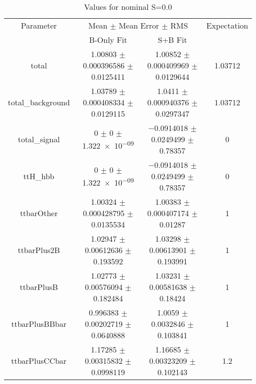 \begin{table}
\centering
\caption{Values for nominal S=0.0}
\begin{tabular}{cccc}
\toprule
Parameter & \multicolumn{2}{c}{Mean $\pm$ Mean Error $\pm$ RMS} & Expectation\\
 & B-Only Fit & S+B Fit & \\
\midrule
total & \num{1.00803} $\pm$ \num{0.000396586} $\pm$ \num{0.0125411} & \num{1.00852} $\pm$ \num{0.000409969} $\pm$ \num{0.0129644} & \num{1.03712}\\
total\_background & \num{1.03789} $\pm$ \num{0.000408334} $\pm$ \num{0.0129115} & \num{1.0411} $\pm$ \num{0.000940376} $\pm$ \num{0.0297347} & \num{1.03712}\\
total\_signal & \num{0} $\pm$ \num{0} $\pm$ \num{1.322e-09} & \num{-0.0914018} $\pm$ \num{0.0249499} $\pm$ \num{0.78357} & \num{0}\\
ttH\_hbb & \num{0} $\pm$ \num{0} $\pm$ \num{1.322e-09} & \num{-0.0914018} $\pm$ \num{0.0249499} $\pm$ \num{0.78357} & \num{0}\\
ttbarOther & \num{1.00324} $\pm$ \num{0.000428795} $\pm$ \num{0.0135534} & \num{1.00383} $\pm$ \num{0.000407174} $\pm$ \num{0.01287} & \num{1}\\
ttbarPlus2B & \num{1.02947} $\pm$ \num{0.00612636} $\pm$ \num{0.193592} & \num{1.03298} $\pm$ \num{0.00613901} $\pm$ \num{0.193991} & \num{1}\\
ttbarPlusB & \num{1.02773} $\pm$ \num{0.00576094} $\pm$ \num{0.182484} & \num{1.03231} $\pm$ \num{0.00581638} $\pm$ \num{0.18424} & \num{1}\\
ttbarPlusBBbar & \num{0.996383} $\pm$ \num{0.00202719} $\pm$ \num{0.0640888} & \num{1.0059} $\pm$ \num{0.0032846} $\pm$ \num{0.103841} & \num{1}\\
ttbarPlusCCbar & \num{1.17285} $\pm$ \num{0.00315832} $\pm$ \num{0.0998119} & \num{1.16685} $\pm$ \num{0.00323209} $\pm$ \num{0.102143} & \num{1.2}\\
\bottomrule
\end{tabular}
\end{table}